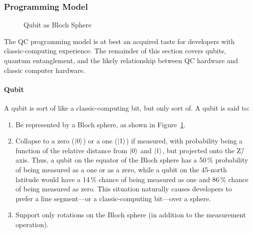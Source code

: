 \subsubsection{Programming Model}
\label{sec:future:Programming Model}

\begin{figure}[tb]
\centering
{}
\caption{Qubit as Bloch Sphere}
\label{fig:future:Qubit as Bloch Sphere}
\end{figure}

The QC programming model is at best an acquired taste for developers
with classic-computing experience.
The remainder of this section covers qubits,
quantum entanglement,
and
the likely relationship between QC hardware and classic computer hardware.

\paragraph{Qubit}

A qubit is sort of like a classic-computing bit, but only sort of.
A qubit is said to:

\begin{enumerate}
\item	Be represented by a Bloch sphere, as shown in
	Figure~\ref{fig:future:Qubit as Bloch Sphere}.
\item	Collapse to a zero ($\ket{0}$) or a one ($\ket{1}$) if measured,
	with probability being a function of the relative distance from
	$\ket{0}$ and $\ket{1}$, but projected onto the Z\=/axis.
	Thus, a qubit on the equator of the Bloch sphere has a 50\,\%
	probability of being measured as a one or as a zero, while
	a qubit on the 45\textdegree-north latitude would have
	a 14\,\% chance of being measured as one and 86\,\% chance
	of being measured as zero.
	This situation naturally causes developers to prefer a line
	segment---or a classic-computing bit---over a sphere.
\item	Support only rotations on the Bloch sphere (in addition to
	the measurement operation).
\end{enumerate}

